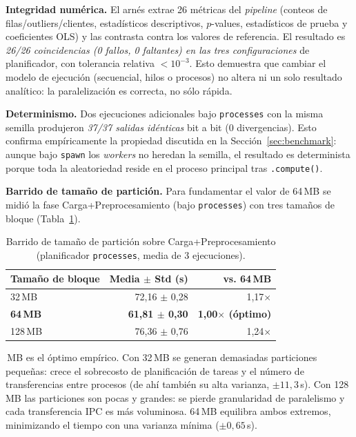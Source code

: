 \documentclass[12pt,letterpaper]{article}
\begin{document}
\noindent\textbf{Integridad numérica.} El arnés extrae 26 métricas del \textit{pipeline} (conteos de
filas/outliers/clientes, estadísticos descriptivos, $p$-values, estadísticos de prueba y coeficientes
OLS) y las contrasta contra los valores de referencia. El resultado es \textit{26/26 coincidencias
(0 fallos, 0 faltantes) en las tres configuraciones} de planificador, con tolerancia relativa
$<10^{-3}$. Esto demuestra que cambiar el modelo de ejecución (secuencial, hilos o procesos) no altera
ni un solo resultado analítico: la paralelización es correcta, no sólo rápida.

\noindent\textbf{Determinismo.} Dos ejecuciones adicionales bajo \texttt{processes} con la misma semilla
produjeron \textit{37/37 salidas idénticas} bit a bit (0 divergencias). Esto confirma empíricamente la
propiedad discutida en la Sección~\ref{sec:benchmark}: aunque bajo \texttt{spawn} los \textit{workers}
no heredan la semilla, el resultado es determinista porque toda la aleatoriedad reside en el proceso
principal tras \texttt{.compute()}.

\noindent\textbf{Barrido de tamaño de partición.} Para fundamentar el valor de 64\,MB se midió la fase
Carga+Preprocesamiento (bajo \texttt{processes}) con tres tamaños de bloque (Tabla~\ref{tab:sweep}).

\begin{table}[H]
\centering
\small
\begin{tabular}{lrr}
\toprule
\textbf{Tamaño de bloque} & \textbf{Media $\pm$ Std (s)} & \textbf{vs. 64\,MB} \\
\midrule
32\,MB  & 72,16 $\pm$ 0,28 & 1,17$\times$ \\
\textbf{64\,MB}  & \textbf{61,81 $\pm$ 0,30} & \textbf{1,00$\times$ (óptimo)} \\
128\,MB & 76,36 $\pm$ 0,76 & 1,24$\times$ \\
\bottomrule
\end{tabular}
\caption{Barrido de tamaño de partición sobre Carga+Preprocesamiento (planificador \texttt{processes},
media de 3 ejecuciones).}
\label{tab:sweep}
\end{table}

\,MB es el óptimo empírico. Con 32\,MB se generan demasiadas particiones pequeñas: crece
el sobrecosto de planificación de tareas y el número de transferencias entre procesos (de ahí también
su alta varianza, $\pm 11,3$\,s). Con 128\,MB las particiones son pocas y grandes: se pierde granularidad
de paralelismo y cada transferencia IPC es más voluminosa. 64\,MB equilibra ambos extremos, minimizando
el tiempo con una varianza mínima ($\pm 0,65$\,s).
\end{document}
